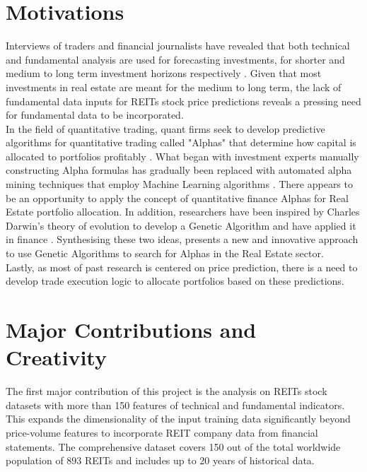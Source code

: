 \documentclass[a4paper,12pt]{report}
\numberwithin{equation}{section}
\theoremstyle{definition}
\begin{document}
\section{Motivations}
Interviews of traders and financial journalists have revealed that both technical and fundamental analysis are used for forecasting investments, for shorter and medium to long term investment horizons respectively \citep{oberlechner_importance_2001}. Given that most investments in real estate are meant for the medium to long term, the lack of fundamental data inputs for REITs stock price predictions reveals a pressing need for fundamental data to be incorporated. \\ 


In the field of quantitative trading, quant firms seek to develop predictive algorithms for quantitative trading called "Alphas" that determine how capital is allocated to portfolios profitably \citep{tulchinsky_finding_2020}. What began with investment experts manually constructing Alpha formulas has gradually been replaced with automated alpha mining techniques that employ Machine Learning algorithms \citep{wang_alpha-gpt_2023}. There appears to be an opportunity to apply the concept of quantitative finance Alphas for Real Estate portfolio allocation. In addition, researchers have been inspired by Charles Darwin's theory of evolution \citep{ruse_charles_1975} to develop a Genetic Algorithm and have applied it in finance \citep{aguilar-rivera_genetic_2015}. Synthesising these two ideas, presents a new and innovative approach to use Genetic Algorithms to search for Alphas in the Real Estate sector. \\

Lastly, as most of past research is centered on price prediction, there is a need to develop trade execution logic to allocate portfolios based on these predictions.




\section{Major Contributions and Creativity}
The first major contribution of this project is the analysis on REITs stock datasets with more than 150 features of technical and fundamental indicators. This expands the dimensionality of the input training data significantly beyond price-volume features to incorporate REIT company data from financial statements. The comprehensive dataset covers 150 out of the total worldwide population of 893 REITs and includes up to 20 years of historical data.\\
\end{document}
